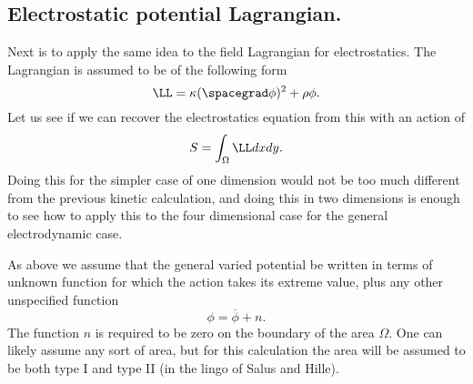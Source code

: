 \subsection{Electrostatic potential Lagrangian.}
%
Next is to apply the same idea to the field Lagrangian for electrostatics.  The Lagrangian is assumed to be of the following form
%
\begin{equation}\label{eqn:lagrangianFieldDensity:1374}
\LL = \kappa (\spacegrad \phi)^2 + \rho \phi.
\end{equation}
%
Let us see if we can recover the electrostatics equation from this with an action of
%
\begin{equation}\label{eqn:maxFieldLag:densityaction}
S = \int_{\Omega} \LL dx dy.
\end{equation}
%
Doing this for the simpler case of one dimension would not be too much different from the previous kinetic calculation, and doing this in two dimensions is enough
to see how to apply this to the four dimensional case for the general electrodynamic case.

As above we assume that the general varied potential be written in terms of unknown function for which the action takes its extreme value, plus any other unspecified
function
%
\begin{equation}\label{eqn:maxFieldLag:barphi}
\phi = \overbar{\phi} + n.
\end{equation}
%
The function \(n\) is required to be zero on the boundary of the area \(\Omega\).  One can likely assume any sort of area, but for this calculation
the area will be assumed to be both type I and type II (in the lingo of Salus and Hille).

